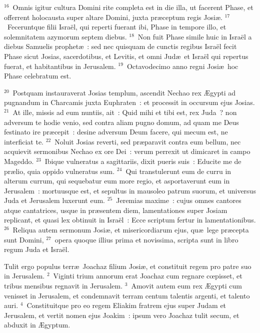 ${}^{16}$~Omnis igitur cultura Domini rite completa est in die illa, ut facerent Phase, et offerrent holocausta super altare Domini, juxta pr\ae ceptum regis Josi\ae .
${}^{17}$~Feceruntque filii Isra\"el, qui reperti fuerant ibi, Phase in tempore illo, et solemnitatem azymorum septem diebus.
${}^{18}$~Non fuit Phase simile huic in Isra\"el a diebus Samuelis prophet\ae~: sed nec quisquam de cunctis regibus Isra\"el fecit Phase sicut Josias, sacerdotibus, et Levitis, et omni Jud\ae\ et Isra\"el qui repertus fuerat, et habitantibus in Jerusalem.
${}^{19}$~Octavodecimo anno regni Josi\ae\ hoc Phase celebratum est.


${}^{20}$~Postquam instauraverat Josias templum, ascendit Nechao rex \AE gypti ad pugnandum in Charcamis juxta Euphraten~: et processit in occursum ejus Josias.
${}^{21}$~At ille, missis ad eum nuntiis, ait~: Quid mihi et tibi est, rex Juda~? non adversum te hodie venio, sed contra aliam pugno domum, ad quam me Deus festinato ire pr\ae cepit~: desine adversum Deum facere, qui mecum est, ne interficiat te.
${}^{22}$~Noluit Josias reverti, sed pr\ae paravit contra eum bellum, nec acquievit sermonibus Nechao ex ore Dei~: verum perrexit ut dimicaret in campo Mageddo.
${}^{23}$~Ibique vulneratus a sagittariis, dixit pueris suis~: Educite me de pr\ae lio, quia oppido vulneratus sum.
${}^{24}$~Qui transtulerunt eum de curru in alterum currum, qui sequebatur eum more regio, et asportaverunt eum in Jerusalem~: mortuusque est, et sepultus in mausoleo patrum suorum, et universus Juda et Jerusalem luxerunt eum.
${}^{25}$~Jeremias maxime~: cujus omnes cantores atque cantatrices, usque in pr\ae sentem diem, lamentationes super Josiam replicant, et quasi lex obtinuit in Isra\"el~: Ecce scriptum fertur in lamentationibus.
${}^{26}$~Reliqua autem sermonum Josi\ae , et misericordiarum ejus, qu\ae\ lege pr\ae cepta sunt Domini,
${}^{27}$~opera quoque illius prima et novissima, scripta sunt in libro regum Juda et Isra\"el.

\lettrine[lines=10,image=true,loversize=0.05,lraise=-0.03]{T}{}ulit ergo populus terr\ae\ Joachaz filium Josi\ae , et constituit regem pro patre suo in Jerusalem.
${}^{2}$~Viginti trium annorum erat Joachaz cum regnare cœpisset, et tribus mensibus regnavit in Jerusalem.
${}^{3}$~Amovit autem eum rex \AE gypti cum venisset in Jerusalem, et condemnavit terram centum talentis argenti, et talento auri.
${}^{4}$~Constituitque pro eo regem Eliakim fratrem ejus super Judam et Jerusalem, et vertit nomen ejus Joakim~: ipsum vero Joachaz tulit secum, et abduxit in \AE gyptum.


